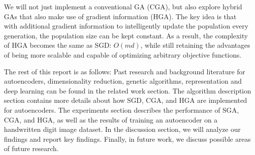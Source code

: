 We will not just implement a conventional GA (CGA), but also explore hybrid GAs that also make use of gradient information (HGA). The key idea is that with additional gradient information to intelligently update the population every generation, the population size can be kept constant. As a result, the complexity of HGA becomes the same as SGD: $O(md)$, while still retaining the advantages of being more scalable and capable of optimizing arbitrary objective functions.

The rest of this report is as follows: Past research and background literature for autoencoders, dimensionality reduction, genetic algorithms, representation and deep learning can be found in the related work section. The algorithm description section contains more details about how SGD, CGA, and HGA are implemented for autoencoders. The experiments section describes the performance of SGA, CGA, and HGA, as well as the results of training an autoencoder on a handwritten digit image dataset. In the discussion section, we will analyze our findings and report key findings. Finally, in future work, we discuss possible areas of future research.  




